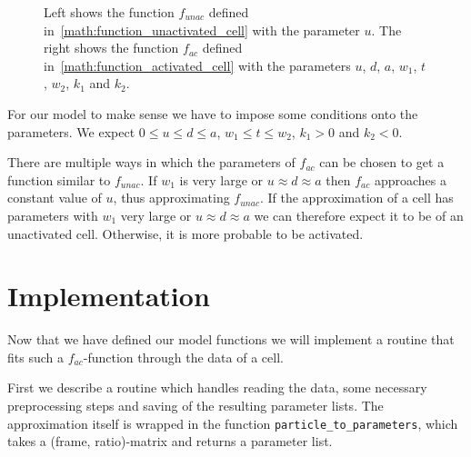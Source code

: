 \begin{figure}
\begin{subfigure}{0.45\linewidth}
	\end{subfigure}
	
	\caption{Left shows the function $f_{unac}$ defined in~\ref{math:function_unactivated_cell} with the parameter $u$. The right shows the function $f_{ac}$ defined in~\ref{math:function_activated_cell} with the parameters $u$, $d$, $a$, $w_1$, $t$, $w_2$, $k_1$ and $k_2$.}
	\label{fig:typical_time_series_with_parameters}
\end{figure}

For our model to make sense we have to impose some conditions onto the parameters. We expect $0 \leq u \leq d \leq a$, $w_1 \leq t \leq w_2$, $k_1 > 0$ and $k_2 < 0$.

There are multiple ways in which the parameters of $f_{ac}$ can be chosen to get a function similar to $f_{unac}$. If $w_1$ is very large or $u \approx d \approx a$ then $f_{ac}$ approaches a constant value of $u$, thus approximating $f_{unac}$. If the approximation of a cell has parameters with $w_1$ very large or $u \approx d \approx a$ we can therefore expect it to be of an unactivated cell. Otherwise, it is more probable to be activated.

\section{Implementation}

Now that we have defined our model functions we will implement a routine that fits such a $f_{ac}$-function through the data of a cell.

First we describe a routine which handles reading the data, some necessary preprocessing steps and saving of the resulting parameter lists. The approximation itself is wrapped in the function \texttt{particle\_to\_parameters}, which takes a (frame, ratio)-matrix and returns a parameter list.

